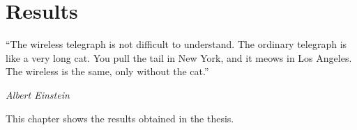 \chapter{Results}
\label{c:results}

\epigraph{\enquote{The wireless telegraph is not difficult to understand. The ordinary telegraph is like a very long cat. You pull the tail in New York, and it meows in Los Angeles. The wireless is the same, only without the cat.}}{\emph{Albert Einstein}}

This chapter shows the results obtained in the thesis.
